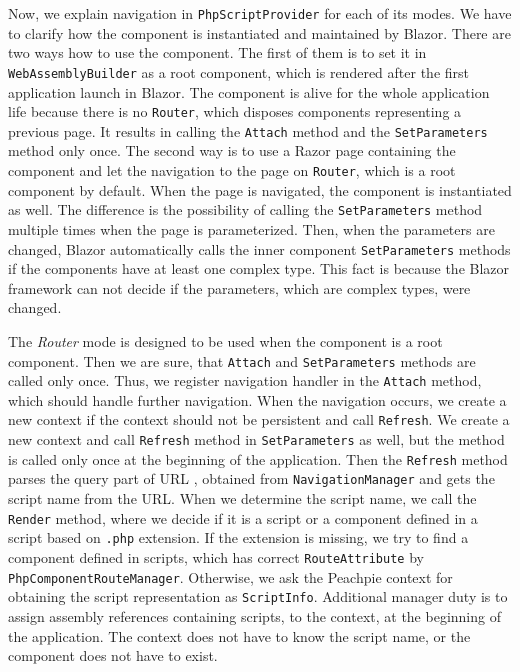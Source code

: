 Now, we explain navigation in \texttt{PhpScriptProvider} for each of its modes.
We have to clarify how the component is instantiated and maintained by Blazor.
There are two ways how to use the component.
The first of them is to set it in \texttt{WebAssemblyBuilder} as a root component,
which is rendered after the first application launch in Blazor.
The component is alive for the whole application life because there is no \texttt{Router}, which disposes components representing a previous page. 
It results in calling the \texttt{Attach} method and the \texttt{SetParameters} method only once.
The second way is to use a Razor page containing the component and let the navigation to the page on \texttt{Router}, which is a root component by default.
When the page is navigated, the component is instantiated as well.
The difference is the possibility of calling the \texttt{SetParameters} method multiple times when the page is parameterized.
Then, when the parameters are changed, Blazor automatically calls the inner component \texttt{SetParameters} methods if the components have at least one complex type. 
This fact is because the Blazor framework can not decide if the parameters, which are complex types, were changed.
\par
The \textit{Router} mode is designed to be used when the component is a root component.
Then we are sure, that \texttt{Attach} and \texttt{SetParameters} methods are called only once.
Thus, we register navigation handler in the \texttt{Attach} method, which should handle further navigation.
When the navigation occurs, we create a new context if the context should not be persistent and call \texttt{Refresh}.
We create a new context and call \texttt{Refresh} method in \texttt{SetParameters} as well, but the method is called only once at the beginning of the application.
Then the \texttt{Refresh} method parses the query part of URL , obtained from \texttt{NavigationManager} and gets the script name from the URL.
When we determine the script name, we call the \texttt{Render} method, where we decide if it is a script or a component defined in a script based on \texttt{.php} extension.
If the extension is missing, we try to find a component defined in scripts, which has correct \texttt{RouteAttribute} by \texttt{PhpComponentRouteManager}.
Otherwise, we ask the Peachpie context for obtaining the script representation as \texttt{ScriptInfo}.
Additional manager duty is to assign assembly references containing scripts, to the context, at the beginning of the application.
The context does not have to know the script name, or the component does not have to exist. 
